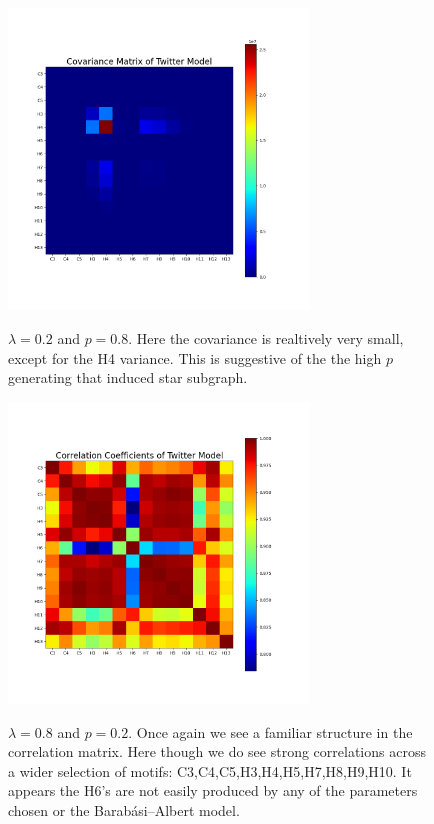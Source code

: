 \begin{figure}
    \includegraphics[width=08cm]{Images/CovMatTwitterModel020809.png}\
    \centering
    \caption{$\lambda=0.2$ and $p=0.8$. Here the covariance is realtively 
    very small, except for the H4 variance. This is suggestive of the 
    the high $p$ generating that induced star subgraph.}
\end{figure}

\begin{figure}
    \includegraphics[width=08cm]{Images/CorrCoefTwitterModel080209.png}\
    \centering
    \caption{$\lambda=0.8$ and $p=0.2$. Once again we see a familiar structure
    in the correlation matrix. Here though we do see strong correlations 
    across a wider selection of motifs: C3,C4,C5,H3,H4,H5,H7,H8,H9,H10. It appears
    the H6's are not easily produced by any of the parameters chosen or the 
    Barabási–Albert model.}
\end{figure}


